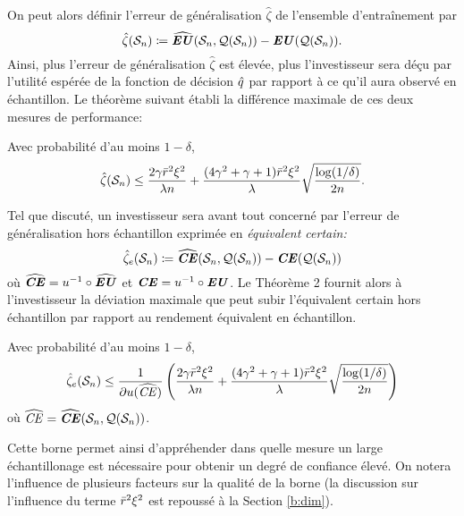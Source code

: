 On peut alors définir l'erreur de généralisation $\hat\zeta$ de l'ensemble d'entraînement par
\begin{equation}
  \hat\zeta(\mathcal S_n) \coloneqq \operatorname{\widehat{\operatorname{\mbox{\textbf{\textit{EU}}}}}}(\mathcal S_n,\mathcal{Q}(\mathcal S_n)) - \operatorname{\mbox{\textbf{\textit{EU}}}}(\mathcal{Q}(\mathcal S_n)).
\end{equation}
Ainsi, plus l'erreur de généralisation $\hat\zeta$ est élevée, plus l'investisseur sera déçu
par l'utilité espérée de la fonction de décision $\hat q$ par rapport à ce qu'il aura observé
en échantillon. Le théorème suivant établi la différence maximale de ces deux mesures de
performance:

\begin{thm}
  Avec probabilité d'au moins $1-\delta$, 
  \begin{equation}
    \hat\zeta(\mathcal S_n) \leq \frac{2\gamma\bar r^2\xi^2}{\lambda n} + \frac{(4\gamma^2 + \gamma +
      1)\bar r^2\xi^2}{\lambda}\sqrt{\frac{\log(1/\delta)}{2n}}.
  \end{equation}
\end{thm}

Tel que discuté, un investisseur sera avant tout concerné par l'erreur de généralisation
hors échantillon exprimée en \textit{équivalent certain:}
\begin{equation}
  \hat\zeta_e(\mathcal S_n) \coloneqq \operatorname{\widehat{\operatorname{\mbox{\textbf{\textit{CE}}}}}}(\mathcal S_n,\mathcal{Q}(\mathcal S_n)) - \operatorname{\mbox{\textbf{\textit{CE}}}}(\mathcal{Q}(\mathcal S_n))
\end{equation}
où $\operatorname{\widehat{\operatorname{\mbox{\textbf{\textit{CE}}}}}} = u^{-1} \circ \operatorname{\widehat{\operatorname{\mbox{\textbf{\textit{EU}}}}}}$ et $\operatorname{\mbox{\textbf{\textit{CE}}}} = u^{-1} \circ \operatorname{\mbox{\textbf{\textit{EU}}}}$. Le Théorème 2 fournit alors à
l'investisseur la déviation maximale que peut subir l'équivalent certain hors échantillon
par rapport au rendement équivalent en échantillon.

\begin{thm}
  Avec probabilité d'au moins $1-\delta$,
  \begin{equation}
    \hat\zeta_e(\mathcal S_n) \leq \frac{1}{\partial u(\operatorname{\widehat{\operatorname{\mbox{\textit{CE}}}}})}\left( \frac{2\gamma\bar r^2\xi^2}{\lambda n} + \frac{(4\gamma^2 + \gamma +
        1)\bar r^2\xi^2}{\lambda}\sqrt{\frac{\log(1/\delta)}{2n}}\right) 
  \end{equation}
  où $\operatorname{\widehat{\operatorname{\mbox{\textit{CE}}}}} = \operatorname{\widehat{\operatorname{\mbox{\textbf{\textit{CE}}}}}}(\mathcal S_n,\mathcal{Q}(\mathcal S_n))$. 
\end{thm}

Cette borne permet ainsi d'appréhender dans quelle mesure un large échantillonage est
nécessaire pour obtenir un degré de confiance élevé. On notera l'influence de plusieurs
facteurs sur la qualité de la borne (la discussion sur l'influence du terme $\bar r^2\xi^2$
est repoussé à la Section \ref{b:dim}).

